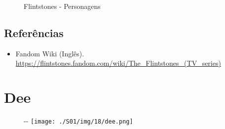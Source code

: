 \begin{figure}
  \centering
    \caption{Flintstones - Personagens\label{fig:flintstones-personagens}}
\end{figure}

\hypertarget{referuxeancias-2}{%
\subsection{Referências}\label{referuxeancias-2}}

\begin{itemize}
\tightlist
\item
  \sloppy Fandom Wiki (Inglês). \url{https://flintstones.fandom.com/wiki/The_Flintstones_(TV_series)}
\end{itemize}

\hypertarget{dee}{%
\section{Dee}\label{dee}}

\begin{figure}[!ht]
  \begin{adjustwidth}{-\oddsidemargin-1in}{-\rightmargin}
    \centering
    \texttt{[image: ./S01/img/18/dee.png]}
  \end{adjustwidth}
\end{figure}

